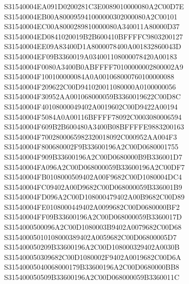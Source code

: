 \documentclass[12pt,a4paper]{article}
\begin{document}
\begin{framed}
{S31540004EA091D0200281C3E0089010000080A2C00D7E\newline
S31540004EB00A800095941000000302000080A2C00101\newline
S31540004EC00A8000289810000080A340011A80000D37\newline
S31540004ED0841020019B2B600410BFFFFC9803200127\newline
S31540004EE09A83400D1A8000078400A001832860043D\newline
S31540004EF09B3360019A034001108000078420A00183\newline
S31540004F0080A3400B0ABFFFF70100000002800002A9\newline
S31540004F100100000084A0A001068000760100000088\newline
S31540004F209622C00D941020011080000A0100000056\newline
S31540004F30952AA001068000059B3360019622C00D8C\newline
S31540004F40108000049402A0019602C00D9422A00194\newline
S31540004F5084A0A00116BFFFF78092C0003080006594\newline
S31540004F609B2B600480A3400B08BFFFFE9883200163\newline
S31540004F7002800065982320018092C000952AA004F3\newline
S31540004F800680002F9B33600196A2C00D0680001755\newline
S31540004F909B33600196A2C00D0680000B9B336001D7\newline
S31540004FA096A2C00D068000059B33600196A2C00DF7\newline
S31540004FB0108000509402A00F9682C00D1080004DC4\newline
S31540004FC09402A00D9682C00D068000059B336001B9\newline
S31540004FD096A2C00D108000479402A00B9682C00D89\newline
S31540004FE0108000449402A0099682C00D0680000BF2\newline
S31540004FF09B33600196A2C00D068000059B3360017D\newline
S3154000500096A2C00D1080003B9402A0079682C00D68\newline
S31540005010108000389402A0059682C00D06800005D7\newline
S315400050209B33600196A2C00D108000329402A0030B\newline
S315400050309682C00D1080002F9402A0019682C00D6A\newline
S31540005040068000179B33600196A2C00D0680000BB8\newline
S315400050509B33600196A2C00D068000059B3360011C\newline
}
\end{framed}
\end{document}
